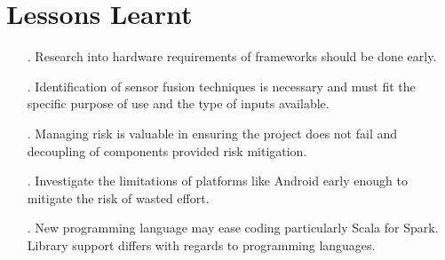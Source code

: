 \documentclass[prodmode,acmtosem]{acmsmall} %
\begin{document}
\section{Lessons Learnt}
\begin{itemize}
\item[.] Research into hardware requirements of frameworks should be done early.
\item[.] Identification of sensor fusion techniques is necessary and must fit the specific purpose of use and the type of inputs available.
\item[.] Managing risk is valuable in ensuring the project does not fail and decoupling of components provided risk mitigation.
\item[.] Investigate the limitations of platforms like Android early enough to mitigate the risk of wasted effort.
\item[.] New programming language may ease coding particularly Scala for Spark. Library support differs with regards to programming languages.
\end{itemize}
\end{document}
